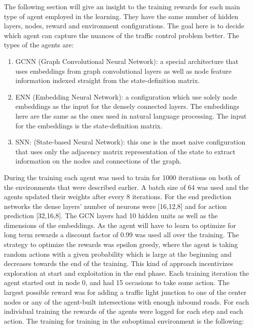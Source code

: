 \documentclass[
]{elteikthesis}[2023/04/10]
\begin{document}
The following section will give an insight to the training rewards
for each main type of agent employed in the learning. They have the
same number of hidden layers, nodes, reward and environment configurations.
The goal here is to decide which agent can capture the nuances of
the traffic control problem better. The types of the agents are:
\begin{enumerate}
\item GCNN (Graph Convolutional Neural Network): a special architecture
that uses embeddings from graph convolutional layers as well as node
feature information indexed straight from the state-definition matrix. 
\item ENN (Embedding Neural Network): a configuration which use solely node
embeddings as the input for the densely connected layers. The embeddings
here are the same as the ones used in natural language processing.
The input for the embeddings is the state-definition matrix. 
\item SNN: (State-based Neural Network): this one is the most naive configuration
that uses only the adjacency matrix representation of the state to
extract information on the nodes and connections of the graph. 
\end{enumerate}
During the training each agent was used to train for 1000 iterations
on both of the environments that were described earlier. A batch size
of 64 was used and the agents updated their weights after every 8
iterations. For the end prediction networks the dense layers' number
of neurons were {[}16,12,8{]} and for action prediction {[}32,16,8{]}.
The GCN layers had 10 hidden units as well as the dimensions of the
embeddings. As the agent will have to learn to optimize for long term
rewards a discount factor of 0.99 was used all over the training.
The strategy to optimize the rewards was epsilon greedy, where the
agent is taking random actions with a given probability which is large
at the beginning and decreases towards the end of the training. This
kind of approach incentivizes exploration at start and exploitation
in the end phase. Each training iteration the agent started out in
node 0, and had 15 occasions to take some action. The largest possible
reward was for adding a traffic light junction to one of the center
nodes or any of the agent-built intersections with enough inbound
roads. For each individual training the rewards of the agents were
logged for each step and each action. The training for training in
the suboptimal environment is the following: 
\end{document}
